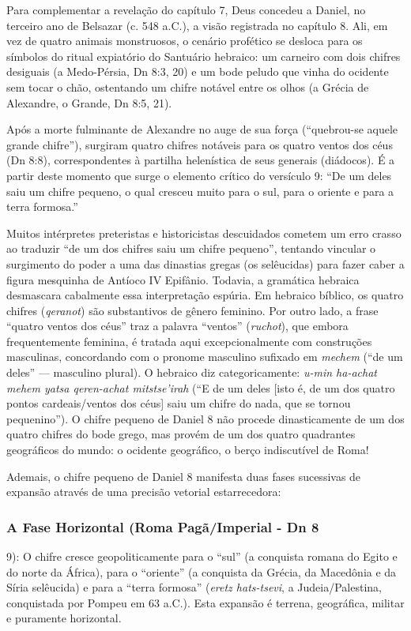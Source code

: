 \documentclass[11pt,a4paper,openany]{book}
\begin{document}
Para complementar a revelação do capítulo 7, Deus concedeu a Daniel, no terceiro ano de Belsazar (c. 548 a.C.), a visão registrada no capítulo 8. Ali, em vez de quatro animais monstruosos, o cenário profético se desloca para os símbolos do ritual expiatório do Santuário hebraico: um carneiro com dois chifres desiguais (a Medo-Pérsia, Dn 8:3, 20) e um bode peludo que vinha do ocidente sem tocar o chão, ostentando um chifre notável entre os olhos (a Grécia de Alexandre, o Grande, Dn 8:5, 21).

Após a morte fulminante de Alexandre no auge de sua força (``quebrou-se aquele grande chifre''), surgiram quatro chifres notáveis para os quatro ventos dos céus (Dn 8:8), correspondentes à partilha helenística de seus generais (diádocos). É a partir deste momento que surge o elemento crítico do versículo 9: ``De um deles saiu um chifre pequeno, o qual cresceu muito para o sul, para o oriente e para a terra formosa.''

Muitos intérpretes preteristas e historicistas descuidados cometem um erro crasso ao traduzir ``de um dos chifres saiu um chifre pequeno'', tentando vincular o surgimento do poder a uma das dinastias gregas (os selêucidas) para fazer caber a figura mesquinha de Antíoco IV Epifânio. Todavia, a gramática hebraica desmascara cabalmente essa interpretação espúria. Em hebraico bíblico, os quatro chifres (\textit{qeranot}) são substantivos de gênero feminino. Por outro lado, a frase ``quatro ventos dos céus'' traz a palavra ``ventos'' (\textit{ruchot}), que embora frequentemente feminina, é tratada aqui excepcionalmente com construções masculinas, concordando com o pronome masculino sufixado em \textit{mechem} (``de um deles'' — masculino plural). O hebraico diz categoricamente: \textit{u-min ha-achat mehem yatsa qeren-achat mitstse'irah} (``E de um deles [isto é, de um dos quatro pontos cardeais/ventos dos céus] saiu um chifre do nada, que se tornou pequenino''). O chifre pequeno de Daniel 8 não procede dinasticamente de um dos quatro chifres do bode grego, mas provém de um dos quatro quadrantes geográficos do mundo: o ocidente geográfico, o berço indiscutível de Roma!

Ademais, o chifre pequeno de Daniel 8 manifesta duas fases sucessivas de expansão através de uma precisão vetorial estarrecedora:


\subsubsection*{A Fase Horizontal (Roma Pagã/Imperial - Dn 8}
9): O chifre cresce geopoliticamente para o ``sul'' (a conquista romana do Egito e do norte da África), para o ``oriente'' (a conquista da Grécia, da Macedônia e da Síria selêucida) e para a ``terra formosa'' (\textit{eretz hats-tsevi}, a Judeia/Palestina, conquistada por Pompeu em 63 a.C.). Esta expansão é terrena, geográfica, militar e puramente horizontal.
\end{document}
